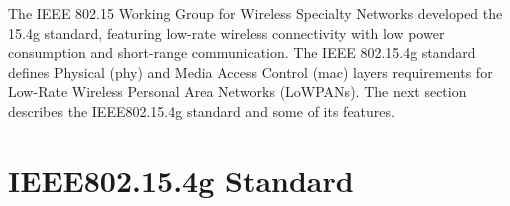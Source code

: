




The IEEE 802.15 Working Group for Wireless Specialty Networks developed the 15.4g standard, featuring low-rate wireless connectivity with low power consumption and short-range communication. The IEEE 802.15.4g standard defines Physical (\ac{phy}) and Media Access Control (\ac{mac}) layers requirements for Low-Rate Wireless Personal Area Networks (\ac{LoWPANs}). The next section describes the IEEE802.15.4g standard and some of its features.



\section{IEEE802.15.4g Standard}


